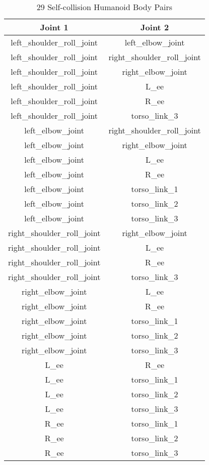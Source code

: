 
\begin{table}[h]
    \centering
    \begin{tabular}{|c|c|}
        \hline
        \textbf{Joint 1} & \textbf{Joint 2} \\
        \hline
        left\_shoulder\_roll\_joint & left\_elbow\_joint \\
        left\_shoulder\_roll\_joint & right\_shoulder\_roll\_joint \\
        left\_shoulder\_roll\_joint & right\_elbow\_joint \\
        left\_shoulder\_roll\_joint & L\_ee \\
        left\_shoulder\_roll\_joint & R\_ee \\
        left\_shoulder\_roll\_joint & torso\_link\_3 \\
        left\_elbow\_joint & right\_shoulder\_roll\_joint \\
        left\_elbow\_joint & right\_elbow\_joint \\
        left\_elbow\_joint & L\_ee \\
        left\_elbow\_joint & R\_ee \\
        left\_elbow\_joint & torso\_link\_1 \\
        left\_elbow\_joint & torso\_link\_2 \\
        left\_elbow\_joint & torso\_link\_3 \\
        right\_shoulder\_roll\_joint & right\_elbow\_joint \\
        right\_shoulder\_roll\_joint & L\_ee \\
        right\_shoulder\_roll\_joint & R\_ee \\
        right\_shoulder\_roll\_joint & torso\_link\_3 \\
        right\_elbow\_joint & L\_ee \\
        right\_elbow\_joint & R\_ee \\
        right\_elbow\_joint & torso\_link\_1 \\
        right\_elbow\_joint & torso\_link\_2 \\
        right\_elbow\_joint & torso\_link\_3 \\
        L\_ee & R\_ee \\
        L\_ee & torso\_link\_1 \\
        L\_ee & torso\_link\_2 \\
        L\_ee & torso\_link\_3 \\
        R\_ee & torso\_link\_1 \\
        R\_ee & torso\_link\_2 \\
        R\_ee & torso\_link\_3 \\
        \hline
    \end{tabular}
    \caption{29 Self-collision Humanoid Body Pairs}
    \label{tab:self_collision_pairs}
\end{table}